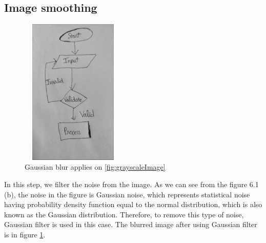 \subsection{Image smoothing}
\begin{figure}[h]
    \centering
    \includegraphics[width=5cm,height=7cm]{Images/Preprocessing/gaussian.png}
    \caption{Gaussian blur applies on \ref{fig:grayscaleImage}}
    \label{fig:gaussian_blur}
\end{figure}
In this step, we filter the noise from the image. As we can see from the figure 6.1 (b), the noise in the figure is Gaussian noise, which represents statistical noise having probability density function equal to the normal distribution, which is also known as the Gaussian distribution. Therefore, to remove this type of noise, Gaussian filter is used in this case. The blurred image after using Gaussian filter is in figure \ref{fig:gaussian_blur}.

